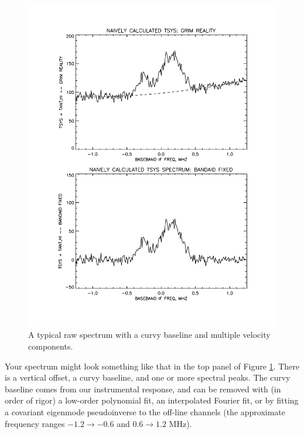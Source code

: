 \documentclass[11pt,preprint]{aastex}
\begin{document}
\begin{figure}[h!]
\begin{center}
%       
\includegraphics[scale=0.5]{bmp_cal1.pdf}
\end{center}
\vspace{-0.3in}
\caption{\footnotesize A typical raw spectrum with a curvy baseline and
  multiple velocity components. \label{rawspect}}
\end{figure}

Your spectrum might look something like that in the top panel of
Figure \ref{rawspect}. There is a vertical offset, a curvy baseline, and
one or more spectral peaks. The curvy baseline comes from our
instrumental response, and can be removed with (in order of rigor)
a low-order polynomial fit, an interpolated Fourier fit, or by fitting a
covariant eigenmode pseudoinverse to the 
off-line channels (the approximate
frequency ranges $-1.2 \rightarrow -0.6$ and $ 0.6 \rightarrow 1.2$
MHz).
\end{document}
